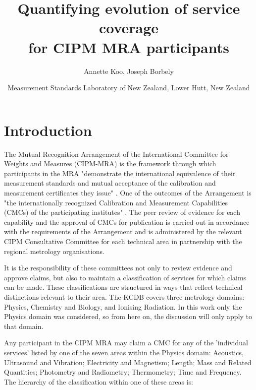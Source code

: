 \documentclass[
	a4paper, %
	10pt, %
	unnumberedsections, %
	twoside, %
]{LTJournalArticle}
\title{Quantifying evolution of service coverage \\ for CIPM MRA participants}
\author{%
	Annette Koo, Joseph Borbely\\ \monthyear
}
\date{Measurement Standards Laboratory of New Zealand, Lower Hutt, New Zealand}
\begin{document}
\maketitle %


\section{Introduction}

The Mutual Recognition Arrangement of the International Committee for Weights and Measures (CIPM-MRA) is the framework through which participants in the MRA "demonstrate the international equivalence of their measurement standards and mutual acceptance of the calibration and measurement certificates they issue" \cite{CIPMMRAweb}. One of the outcomes of the Arrangement is "the internationally recognized Calibration and Measurement Capabilities (CMCs) of the participating institutes" \cite{CIPMMRAweb}. The peer review of evidence for each capability and the approval of CMCs for publication is carried out in accordance with the requirements of the Arrangement and is administered by the relevant CIPM Consultative Committee for each technical area in partnership with the regional metrology organisations.

It is the responsibility of these committees not only to review evidence and approve claims, but also to maintain a classification of services \cite{Classifications} for which claims can be made. These classifications  are structured in ways that reflect technical distinctions relevant to their area. The KCDB covers three metrology domains: Physics, Chemistry and Biology, and Ionising Radiation. In this work only the Physics domain was considered, so from here on, the discussion will only apply to that domain.

Any participant in the CIPM MRA may claim a CMC for any of the 'individual services' listed by one of the seven areas within the Physics domain: Acoustics, Ultrasound and Vibration; Electricity and Magnetism; Length; Mass and Related Quantities; Photometry and Radiometry; Thermometry; Time and Frequency. The hierarchy of the classification within one of these areas is:




\vspace{5pt}
\end{document}
